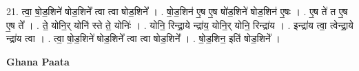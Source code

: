 \documentclass[17pt]{extarticle}
\begin{document}
21. त्वा॒ षो॒ड॒शिने॑ षोड॒शिने᳚ त्वा त्वा षोड॒शिने᳚ । . षो॒ड॒शिन॑ ए॒ष ए॒ष षो॑ड॒शिने॑ षोड॒शिन॑ ए॒षः । . ए॒ष ते॑ त ए॒ष ए॒ष ते᳚ । . ते॒ योनि॒र् योनि॑ स्ते ते॒ योनिः॑ । . योनि॒ रिन्द्रा॒ये न्द्रा॑य॒ योनि॒र् योनि॒ रिन्द्रा॑य । . इन्द्रा॑य त्वा॒ त्वेन्द्रा॒ये न्द्रा॑य त्वा । . त्वा॒ षो॒ड॒शिने॑ षोड॒शिने᳚ त्वा त्वा षोड॒शिने᳚ । . षो॒ड॒शिन॒ इति॑ षोड॒शिने᳚ । \newline

\textbf{Ghana Paata } \newline
\end{document}
